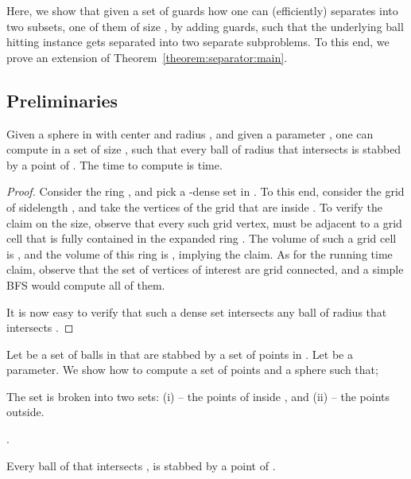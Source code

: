 \InSubmitVer{\documentclass[11pt]{article}}
\numberwithin{figure}{section}
\numberwithin{table}{section}
\numberwithin{equation}{section}
\newcommand{\lemlab}[1]{\label{lemma:#1}}
\newcommand{\thmrefpage}[1]{Theorem~\ref{theorem:#1}}
\begin{document}
Here, we show that given a set of guards  how one can
(efficiently) separates  into two subsets, one of them of size
, by adding  guards, such that the
underlying ball hitting instance gets separated into two separate
subproblems. To this end, we prove an extension of
\thmrefpage{separator:main}.

\subsection{Preliminaries}

\begin{lemma}
    \lemlab{shield:ball}Given a sphere  in  with center  and radius
    , and given a parameter , one can
    compute in a set  of size , such
    that every ball of radius  that intersects 
    is stabbed by a point of . The time to compute  is
     time.
\end{lemma}

\begin{proof}
    Consider the ring , and pick a -dense set in . To
    this end, consider the grid of sidelength , and
    take the vertices of the grid that are inside . To verify
    the claim on the size, observe that every such grid vertex, must
    be adjacent to a grid cell that is fully contained in the expanded
    ring . The volume
    of such a grid cell is , and the volume of this
    ring is , implying the claim. As for the
    running time claim, observe that the set of vertices of interest
    are grid connected, and a simple \si{BFS} would compute all of
    them.
    
    It is now easy to verify that such a dense set intersects any ball
    of radius  that intersects .
\end{proof}




Let  be a set of balls in  that are stabbed by a set
 of points in . Let  be a parameter. We show how to
compute a set  of  points and a sphere
 such that;
\begin{compactenum}[\quad(A)]
    \item The set  is broken into two sets: (i)  --
    the points of  inside , and (ii)  -- the
    points outside.
    
    \item .
    
    \item Every ball of  that intersects , is
    stabbed by a point of .
\end{compactenum}
\end{document}
